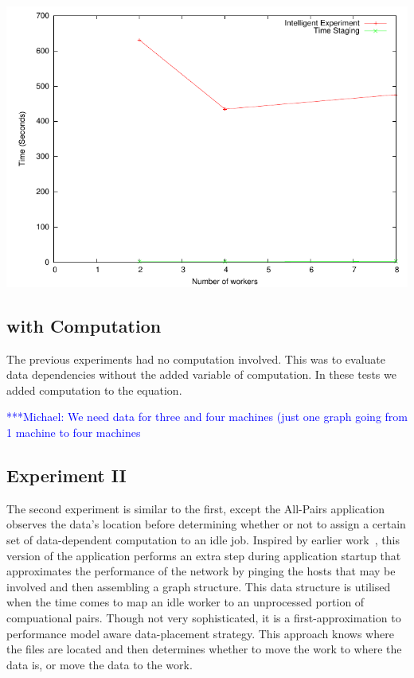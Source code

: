 \documentclass{rspublic}
\newcommand{\micnote}[1]{ {\textcolor{blue} { ***Michael: #1 }}} \else
\newcommand{\jhanote}[1]{} \newcommand{\micnote}[1]{} \newcommand{\fixme}[1]{}
\begin{document}
\includegraphics{data/graphs/StagingAsAPortionOfIntelligenceFigure}

\subsection{with Computation}
The previous experiments had no computation involved.  This was to
evaluate data dependencies without the added variable of computation.
In these tests we added computation to the equation.

\jhanote{We need data for compute (comparision) and I/O (only) for
different data-set sizes} \micnote{We need data for three and four
machines (just one graph going from 1 machine to four machines}

\subsection{Experiment II} The second experiment is similar to the first,
except the All-Pairs application observes the data's location before
determining whether or not to assign a certain set of data-dependent
computation to an idle job.  Inspired by earlier work~\citep{netperf}, this
version of the application performs an extra step during application startup
that approximates the performance of the network by pinging the hosts that may
be involved and then  assembling a graph structure.  This data structure is
utilised when the time comes to map an idle worker to an unprocessed portion of
compuational pairs.  Though not very sophisticated, it is a first-approximation
to performance model aware data-placement strategy.  This approach knows where
the files are located and then determines whether to move the work to where the
data is, or move the data to the work.  \jhanote{Data-aware placement is also
required, i.e., managing location of files.}
\end{document}
